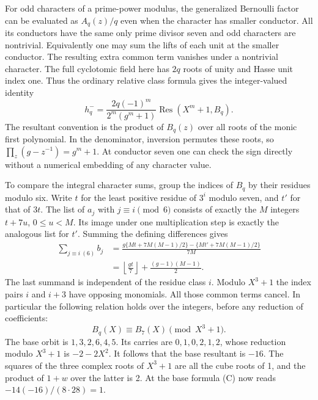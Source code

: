 \documentclass[12pt,letterpaper]{article}
\begin{document}
For odd characters of a prime-power modulus, the generalized Bernoulli factor can be evaluated as \(A_q(z)/q\) even when the character has smaller conductor. All its conductors have the same only prime divisor seven and odd characters are nontrivial. Equivalently one may sum the lifts of each unit at the smaller conductor. The resulting extra common term vanishes under a nontrivial character. The full cyclotomic field here has \(2q\) roots of unity and Hasse unit index one. Thus the ordinary relative class formula gives the integer-valued identity
\[
    h^-_q=\frac{2q(-1)^m}{2^m(g^m+1)}
           \operatorname{Res}(X^m+1,B_q).
 \tag{C}
\]
The resultant convention is the product of \(B_q(z)\) over all roots of the monic first polynomial. In the denominator, inversion permutes these roots, so \(\prod_z(g-z^{-1})=g^m+1\). At conductor seven one can check the sign directly without a numerical embedding of any character value.

To compare the integral character sums, group the indices of \(B_q\) by their residues modulo six. Write \(t\) for the least positive residue of \(3^i\) modulo seven, and \(t'\) for that of \(3t\). The list of \(a_j\) with \(j\equiv i\pmod6\) consists of exactly the \(M\) integers \(t+7u\), \(0\le u<M\). Its image under one multiplication step is exactly the analogous list for \(t'\). Summing the defining differences gives
\[
 \begin{aligned}
 \sum_{j\equiv i\ (6)} b_j
 &=\frac{g\{Mt+7M(M-1)/2\}-\{Mt'+7M(M-1)/2\}}{7M}\\
 &=\left\lfloor\frac{gt}{7}\right\rfloor+\frac{(g-1)(M-1)}2 .
 \end{aligned}
\]
The last summand is independent of the residue class \(i\). Modulo \(X^3+1\) the index pairs \(i\) and \(i+3\) have opposing monomials. All those common terms cancel. In particular the following relation holds over the integers, before any reduction of coefficients:
\[
                 B_q(X)\equiv B_7(X)\pmod {X^3+1}.
\]
The base orbit is \(1,3,2,6,4,5\). Its carries are \(0,1,0,2,1,2\), whose reduction modulo \(X^3+1\) is \(-2-2X^2\). It follows that the base resultant is \(-16\). The squares of the three complex roots of \(X^3+1\) are all the cube roots of 1, and the product of \(1+w\) over the latter is 2. At the base formula (C) now reads \(-14(-16)/(8\cdot28)=1\).
\end{document}

